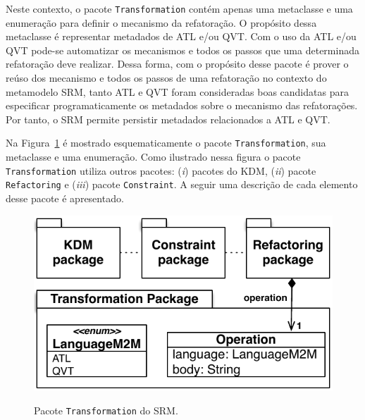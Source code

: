 Neste contexto, o pacote \texttt{Transformation} contém apenas uma metaclasse e uma enumeração para definir o mecanismo da refatoração. O propósito dessa metaclasse é representar metadados de ATL e/ou QVT. Com o uso da ATL e/ou QVT pode-se automatizar os mecanismos e todos os passos que uma determinada refatoração deve realizar. Dessa forma, com o propósito desse pacote é prover o reúso dos mecanismo e todos os passos de uma refatoração no contexto do metamodelo SRM, tanto ATL e QVT foram consideradas boas candidatas para especificar programaticamente os metadados sobre o mecanismo das refatorações. Por tanto, o SRM permite persistir metadados relacionados a ATL e QVT.

Na Figura~\ref{fig:pacote_transformation_srm} é mostrado esquematicamente o pacote \texttt{Transformation}, sua metaclasse e uma enumeração. Como ilustrado nessa figura o pacote \texttt{Transformation} utiliza outros pacotes: (\textit{i}) pacotes do KDM, (\textit{ii}) pacote \texttt{Refactoring} e (\textit{iii}) pacote \texttt{Constraint}. A seguir uma descrição de cada elemento desse pacote é apresentado.

\begin{figure}[h]
	\centering
		\caption{Pacote \texttt{Transformation} do SRM.}
	\includegraphics[scale=0.70]{images/TransformationPackageSRM4}
	\label{fig:pacote_transformation_srm}
	\fautor
\end{figure}

